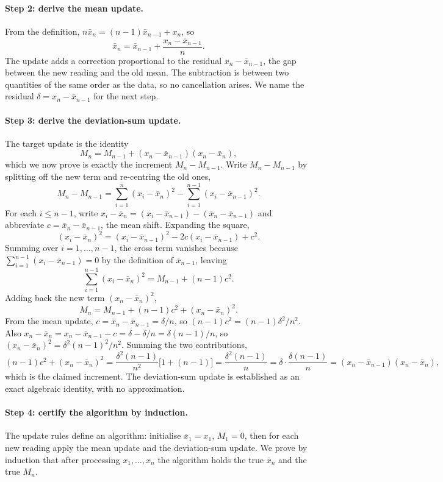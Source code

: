 \paragraph{Step 2: derive the mean update.} From the definition,
$n \bar x_{n} = (n - 1)\bar x_{n-1} + x_{n}$, so
\[
\bar x_{n} = \bar x_{n-1} + \frac{x_{n} - \bar x_{n-1}}{n}.
\]
The update adds a correction proportional to the residual $x_{n} -
\bar x_{n-1}$, the gap between the new reading and the old mean. The
subtraction is between two quantities of the same order as the data, so
no cancellation arises. We name the residual $\delta = x_{n} - \bar
x_{n-1}$ for the next step.

\paragraph{Step 3: derive the deviation-sum update.} The target update
is the identity
\[
M_{n} = M_{n-1} + (x_{n} - \bar x_{n-1})(x_{n} - \bar x_{n}),
\]
which we now prove is exactly the increment $M_{n} - M_{n-1}$. Write
$M_{n} - M_{n-1}$ by splitting off the new term and re-centring the old
ones,
\[
M_{n} - M_{n-1}
= \sum_{i=1}^{n} (x_{i} - \bar x_{n})^{2}
- \sum_{i=1}^{n-1} (x_{i} - \bar x_{n-1})^{2}.
\]
For each $i \leq n - 1$, write $x_{i} - \bar x_{n} = (x_{i} - \bar
x_{n-1}) - (\bar x_{n} - \bar x_{n-1})$ and abbreviate $c = \bar x_{n} -
\bar x_{n-1}$, the mean shift. Expanding the square,
\[
(x_{i} - \bar x_{n})^{2}
= (x_{i} - \bar x_{n-1})^{2}
- 2 c (x_{i} - \bar x_{n-1})
+ c^{2}.
\]
Summing over $i = 1, \ldots, n - 1$, the cross term vanishes because
$\sum_{i=1}^{n-1} (x_{i} - \bar x_{n-1}) = 0$ by the definition of
$\bar x_{n-1}$, leaving
\[
\sum_{i=1}^{n-1} (x_{i} - \bar x_{n})^{2}
= M_{n-1} + (n - 1) c^{2}.
\]
Adding back the new term $(x_{n} - \bar x_{n})^{2}$,
\[
M_{n} = M_{n-1} + (n - 1) c^{2} + (x_{n} - \bar x_{n})^{2}.
\]
From the mean update, $c = \bar x_{n} - \bar x_{n-1} = \delta/n$, so
$(n - 1) c^{2} = (n - 1)\delta^{2}/n^{2}$. Also $x_{n} - \bar x_{n} =
x_{n} - \bar x_{n-1} - c = \delta - \delta/n = \delta(n - 1)/n$, so
$(x_{n} - \bar x_{n})^{2} = \delta^{2}(n - 1)^{2}/n^{2}$. Summing the
two contributions,
\[
(n - 1) c^{2} + (x_{n} - \bar x_{n})^{2}
= \frac{\delta^{2}(n - 1)}{n^{2}}\bigl[1 + (n - 1)\bigr]
= \frac{\delta^{2}(n - 1)}{n}
= \delta \cdot \frac{\delta(n - 1)}{n}
= (x_{n} - \bar x_{n-1})(x_{n} - \bar x_{n}),
\]
which is the claimed increment. The deviation-sum update is established
as an exact algebraic identity, with no approximation.

\paragraph{Step 4: certify the algorithm by induction.} The update
rules define an algorithm: initialise $\bar x_{1} = x_{1}$, $M_{1} = 0$,
then for each new reading apply the mean update and the deviation-sum
update. We prove by induction that after processing $x_{1}, \ldots,
x_{n}$ the algorithm holds the true $\bar x_{n}$ and the true $M_{n}$.

